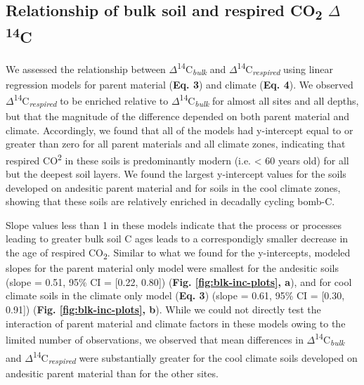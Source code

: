 \documentclass[english,man,floatsintext]{apa6}
\begin{document}
\hypertarget{relationship-of-bulk-soil-and-respired-co2-delta14c}{%
\subsection{\texorpdfstring{Relationship of bulk soil and respired CO\textsubscript{2} \(\Delta\)\textsuperscript{14}C}{Relationship of bulk soil and respired CO2 \textbackslash{}Delta14C}}\label{relationship-of-bulk-soil-and-respired-co2-delta14c}}

We assessed the relationship between \(\Delta\)\textsuperscript{14}C\textsubscript{\emph{bulk}} and \(\Delta\)\textsuperscript{14}C\textsubscript{\emph{respired}} using linear regression models for parent material (\textbf{Eq. 3}) and climate (\textbf{Eq. 4}). We observed \(\Delta\)\textsuperscript{14}C\textsubscript{\emph{respired}} to be enriched relative to \(\Delta\)\textsuperscript{14}C\textsubscript{\emph{bulk}} for almost all sites and all depths, but that the magnitude of the difference depended on both parent material and climate. Accordingly, we found that all of the models had y-intercept equal to or greater than zero for all parent materials and all climate zones, indicating that respired CO\textsuperscript{2} in these soils is predominantly modern (i.e. \textless{} 60 years old) for all but the deepest soil layers. We found the largest y-intercept values for the soils developed on andesitic parent material and for soils in the cool climate zones, showing that these soils are relatively enriched in decadally cycling bomb-C.

Slope values less than 1 in these models indicate that the process or processes leading to greater bulk soil C ages leads to a correspondigly smaller decrease in the age of respired CO\textsubscript{2}. Similar to what we found for the y-intercepts, modeled slopes for the parent material only model were smallest for the andesitic soils (slope = 0.51, 95\% CI = {[}0.22, 0.80{]}) (\textbf{Fig. \ref{fig:blk-inc-plots}, a}), and for cool climate soils in the climate only model (\textbf{Eq. 3}) (slope = 0.61, 95\% CI = {[}0.30, 0.91{]}) (\textbf{Fig. \ref{fig:blk-inc-plots}, b}). While we could not directly test the interaction of parent material and climate factors in these models owing to the limited number of observations, we observed that mean differences in \(\Delta\)\textsuperscript{14}C\textsubscript{\emph{bulk}} and \(\Delta\)\textsuperscript{14}C\textsubscript{\emph{respired}} were substantially greater for the cool climate soils developed on andesitic parent material than for the other sites.
\end{document}
